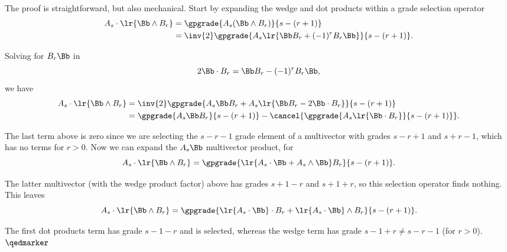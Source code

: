 %
%
The proof is straightforward, but also mechanical.  
Start by expanding the wedge and dot products within a grade selection operator
\begin{equation}\label{eqn:stokesTheoremGeometricAlgebra:1460}
\begin{aligned}
A_s \cdot \lr{ \Bb \wedge B_r }
&=
\gpgrade{A_s (\Bb \wedge B_r)}{s - (r + 1)} \\
&=
\inv{2} \gpgrade{A_s \lr{\Bb B_r + (-1)^{r} B_r \Bb} }{s - (r + 1)}.
\end{aligned}
\end{equation}

Solving for \(B_r \Bb\) in
\begin{equation}\label{eqn:stokesTheoremGeometricAlgebra:1480}
2 \Bb \cdot B_r = \Bb B_r - (-1)^{r} B_r \Bb,
\end{equation}
we have
\begin{equation}\label{eqn:stokesTheoremGeometricAlgebra:1500}
\begin{aligned}
A_s \cdot \lr{ \Bb \wedge B_r }
&=
\inv{2} \gpgrade{ A_s \Bb B_r + A_s \lr{ \Bb B_r - 2 \Bb \cdot B_r } }{s - (r + 1)} \\
&=
\gpgrade{ A_s \Bb B_r }{s - (r + 1)}
-
\cancel{\gpgrade{ A_s \lr{ \Bb \cdot B_r } }{s - (r + 1)}}.
\end{aligned}
\end{equation}

The last term above is zero since we are selecting the \(s - r - 1\) grade element of a multivector with grades \(s - r + 1\) and \(s + r - 1\), which has no terms for \(r > 0\).  Now we can expand the \(A_s \Bb\) multivector product, for
\begin{equation}\label{eqn:stokesTheoremGeometricAlgebra:1520}
A_s \cdot \lr{ \Bb \wedge B_r }
=
\gpgrade{ \lr{ A_s \cdot \Bb + A_s \wedge \Bb} B_r }{s - (r + 1)}.
\end{equation}

The latter multivector (with the wedge product factor) above has grades \(s + 1 - r\) and \(s + 1 + r\), so this selection operator finds nothing.  This leaves
\begin{equation}\label{eqn:stokesTheoremGeometricAlgebra:1540}
A_s \cdot \lr{ \Bb \wedge B_r }
=
\gpgrade{
\lr{ A_s \cdot \Bb } \cdot B_r
+ \lr{ A_s \cdot \Bb } \wedge B_r
}{s - (r + 1)}.
\end{equation}

The first dot products term has grade \(s - 1 - r\) and is selected, whereas the wedge term has grade \(s - 1 + r \ne s - r - 1\) (for \(r > 0\)).  \(\qedmarker\)
